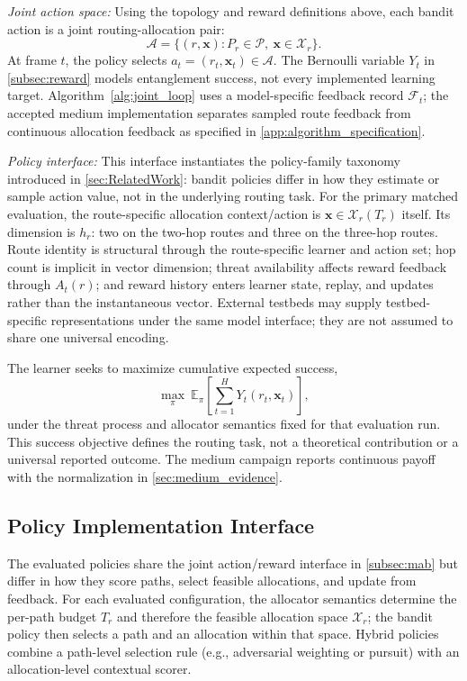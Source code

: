 \documentclass[10pt,journal]{IEEEtran}
\newcommand{\smallTitle}[1]{\vspace{1mm}\noindent\textit{#1:}}
\begin{document}
\smallTitle{Joint action space}
Using the topology and reward definitions above, each bandit action is a joint routing-allocation pair:
\[
\mathcal{A}=\{(r,\mathbf{x}) : P_r\in\mathcal{P},\ \mathbf{x}\in\mathcal{X}_r\}.
\]
At frame $t$, the policy selects $a_t=(r_t,\mathbf{x}_t)\in\mathcal{A}$. The Bernoulli variable $Y_t$ in \cref{subsec:reward} models entanglement success, not every implemented learning target. Algorithm~\ref{alg:joint_loop} uses a model-specific feedback record $\mathcal{F}_t$; the accepted medium implementation separates sampled route feedback from continuous allocation feedback as specified in \cref{app:algorithm_specification}.

\smallTitle{Policy interface}
This interface instantiates the policy-family taxonomy introduced in \cref{sec:RelatedWork}: bandit policies differ in how they estimate or sample action value, not in the underlying routing task. For the primary matched evaluation, the route-specific allocation context/action is $\mathbf{x}\in\mathcal{X}_r(T_r)$ itself. Its dimension is $h_r$: two on the two-hop routes and three on the three-hop routes. Route identity is structural through the route-specific learner and action set; hop count is implicit in vector dimension; threat availability affects reward feedback through $A_t(r)$; and reward history enters learner state, replay, and updates rather than the instantaneous vector. External testbeds may supply testbed-specific representations under the same model interface; they are not assumed to share one universal encoding.

The learner seeks to maximize cumulative expected success,
\[
\max_{\pi}\ \mathbb{E}_{\pi}\!\left[\sum_{t=1}^{H}Y_t(r_t,\mathbf{x}_t)\right],
\]
under the threat process and allocator semantics fixed for that evaluation run. This success objective defines the routing task, not a theoretical contribution or a universal reported outcome. The medium campaign reports continuous payoff with the normalization in \cref{sec:medium_evidence}.

\subsection{Policy Implementation Interface}
\label{subsec:framework}

The evaluated policies share the joint action/reward interface in \cref{subsec:mab} but differ in how they score paths, select feasible allocations, and update from feedback. For each evaluated configuration, the allocator semantics determine the per-path budget $T_r$ and therefore the feasible allocation space $\mathcal{X}_r$; the bandit policy then selects a path and an allocation within that space. Hybrid policies combine a path-level selection rule (e.g., adversarial weighting or pursuit) with an allocation-level contextual scorer.
\end{document}
